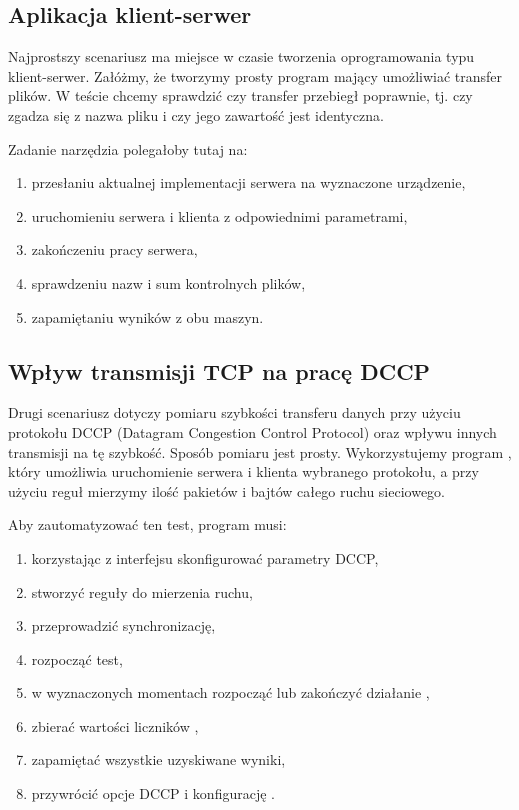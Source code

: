 \documentclass[00-praca-magisterska.tex]{subfiles}
\begin{document}
\subsection{Aplikacja klient-serwer}

Najprostszy scenariusz ma miejsce w czasie tworzenia oprogramowania typu
klient-serwer. Załóżmy, że tworzymy prosty program mający umożliwiać transfer
plików. W teście chcemy sprawdzić czy transfer przebiegł poprawnie, tj. czy
zgadza się z nazwa pliku i czy jego zawartość jest identyczna.

Zadanie narzędzia polegałoby tutaj na:
\begin{enumerate}
\item przesłaniu aktualnej implementacji serwera na wyznaczone urządzenie,
\item uruchomieniu serwera i klienta z odpowiednimi parametrami,
\item zakończeniu pracy serwera,
\item sprawdzeniu nazw i sum kontrolnych plików,
\item zapamiętaniu wyników z obu maszyn.
\end{enumerate}

\subsection{Wpływ transmisji TCP na pracę DCCP}

Drugi scenariusz dotyczy pomiaru szybkości transferu danych przy użyciu
protokołu DCCP (Datagram Congestion Control Protocol) oraz wpływu innych
transmisji na tę szybkość. Sposób pomiaru jest prosty. Wykorzystujemy program
, który umożliwia uruchomienie serwera i klienta wybranego
protokołu, a przy użyciu reguł  mierzymy ilość pakietów i bajtów
całego ruchu sieciowego.

Aby zautomatyzować ten test, program musi:
\begin{enumerate}
\item korzystając z interfejsu  skonfigurować parametry DCCP,
\item stworzyć reguły  do mierzenia ruchu,
\item przeprowadzić synchronizację, 
\item rozpocząć test,
\item w wyznaczonych momentach rozpocząć lub zakończyć działanie ,
\item zbierać wartości liczników ,
\item zapamiętać wszystkie uzyskiwane wyniki,
\item przywrócić opcje DCCP i konfigurację .
\end{enumerate}
\end{document}
